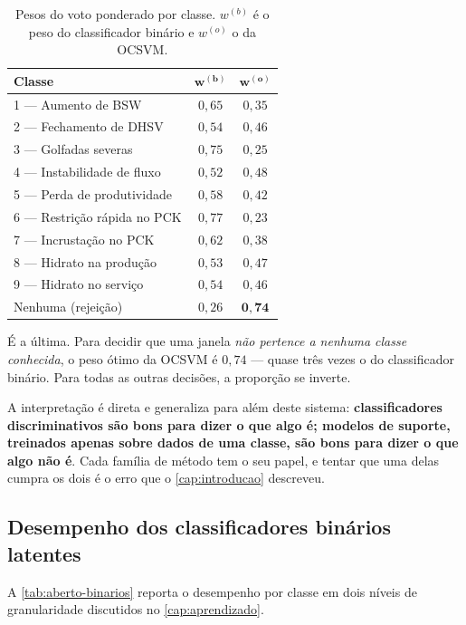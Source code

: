 \begin{table}[htbp]
\centering
\caption{Pesos do voto ponderado por classe. $w^{(b)}$ é o peso do classificador
binário e $w^{(o)}$ o da OCSVM.}
\label{tab:aberto-pesos}
\small
\begin{tabular}{lcc}
\toprule
\textbf{Classe} & $\bm{w^{(b)}}$ & $\bm{w^{(o)}}$ \\
\midrule
1 --- Aumento de BSW          & $0{,}65$ & $0{,}35$ \\
2 --- Fechamento de DHSV      & $0{,}54$ & $0{,}46$ \\
3 --- Golfadas severas        & $0{,}75$ & $0{,}25$ \\
4 --- Instabilidade de fluxo  & $0{,}52$ & $0{,}48$ \\
5 --- Perda de produtividade  & $0{,}58$ & $0{,}42$ \\
6 --- Restrição rápida no PCK & $0{,}77$ & $0{,}23$ \\
7 --- Incrustação no PCK      & $0{,}62$ & $0{,}38$ \\
8 --- Hidrato na produção     & $0{,}53$ & $0{,}47$ \\
9 --- Hidrato no serviço      & $0{,}54$ & $0{,}46$ \\
\midrule
Nenhuma (rejeição)            & $0{,}26$ & $\bm{0{,}74}$ \\
\bottomrule
\end{tabular}
\end{table}

\begin{destaque}
É a última. Para decidir que uma janela \emph{não pertence a nenhuma classe conhecida}, o
peso ótimo da OCSVM é $0{,}74$ --- quase três vezes o do classificador binário. Para
todas as outras decisões, a proporção se inverte.

A interpretação é direta e generaliza para além deste sistema: \textbf{classificadores
discriminativos são bons para dizer o que algo é; modelos de suporte, treinados apenas
sobre dados de uma classe, são bons para dizer o que algo não é}. Cada família de método
tem o seu papel, e tentar que uma delas cumpra os dois é o erro que o
\cref{cap:introducao} descreveu.
\end{destaque}

\subsection{Desempenho dos classificadores binários latentes}

A \cref{tab:aberto-binarios} reporta o desempenho por classe em dois níveis de
granularidade discutidos no \cref{cap:aprendizado}.

